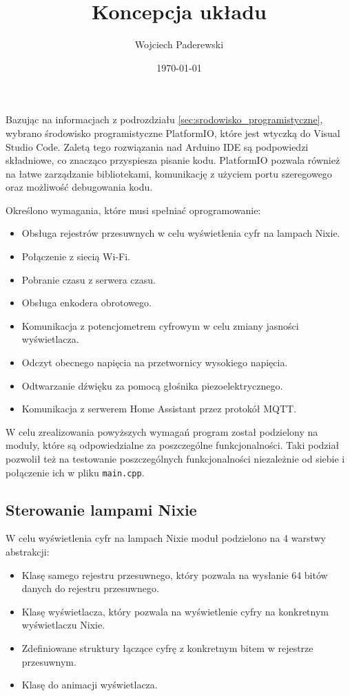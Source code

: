 \documentclass[../main.tex]{subfiles}
\author{Wojciech Paderewski}
\date{\today}
\title{Koncepcja układu}
\begin{document}
Bazując na informacjach z podrozdziału \ref{sec:srodowisko_programistyczne}, wybrano środowisko programistyczne PlatformIO, które jest wtyczką do Visual Studio Code. 
Zaletą tego rozwiązania nad Arduino IDE są podpowiedzi składniowe, co znacząco przyspiesza pisanie kodu.
PlatformIO pozwala również na łatwe zarządzanie bibliotekami, komunikację z użyciem portu szeregowego oraz możliwość debugowania kodu.

Określono wymagania, które musi spełniać oprogramowanie:
\begin{itemize}
  \item Obsługa rejestrów przesuwnych w celu wyświetlenia cyfr na lampach Nixie.
  \item Połączenie z siecią Wi-Fi.
  \item Pobranie czasu z serwera czasu.
  \item Obsługa enkodera obrotowego.
  \item Komunikacja z potencjometrem cyfrowym w celu zmiany jasności wyświetlacza.
  \item Odczyt obecnego napięcia na przetwornicy wysokiego napięcia.
  \item Odtwarzanie dźwięku za pomocą głośnika piezoelektrycznego.
  \item Komunikacja z serwerem Home Assistant przez protokół MQTT.
\end{itemize}

W celu zrealizowania powyższych wymagań program został podzielony na moduły, które są odpowiedzialne za poszczególne funkcjonalności.
Taki podział pozwolił też na testowanie poszczególnych funkcjonalności niezależnie od siebie i połączenie ich w pliku \texttt{main.cpp}.

\subsection{Sterowanie lampami Nixie}
W celu wyświetlenia cyfr na lampach Nixie moduł podzielono na 4 warstwy abstrakcji:
\begin{itemize}
  \item Klasę samego rejestru przesuwnego, który pozwala na wysłanie 64 bitów danych do rejestru przesuwnego.
  \item Klasę wyświetlacza, który pozwala na wyświetlenie cyfry na konkretnym wyświetlaczu Nixie.
  \item Zdefiniowane struktury łączące cyfrę z konkretnym bitem w rejestrze przesuwnym.
  \item Klasę do animacji wyświetlacza.
\end{itemize}
\end{document}
